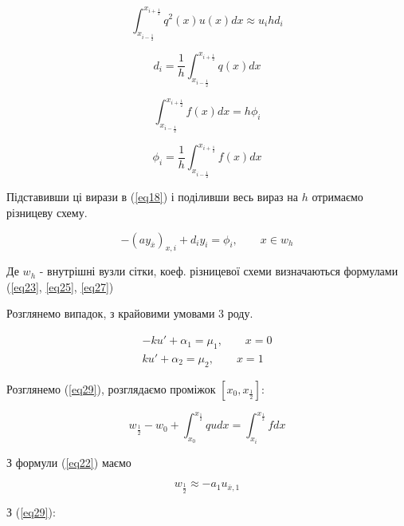 \documentclass[14pt,a4paper]{scrartcl}
\begin{document}
	\begin{equation}\label{eq24}
		\int_{x_{i-\frac{1}{2}}}^{x_{i+\frac{1}{2}}} q^{2}(x)u(x)dx \approx u_{i} h d_{i}
	\end{equation}
	
	
	\begin{equation}\label{eq25}
		d_{i} = \frac{1}{h}\int_{x_{i-\frac{1}{2}}}^{x_{i+\frac{1}{2}}} q(x)dx
	\end{equation}
	
	\begin{equation}\label{eq26}
		\int_{x_{i-\frac{1}{2}}}^{x_{i+\frac{1}{2}}} f(x)dx = h \phi_{i}
	\end{equation}
	
	\begin{equation}\label{eq27}
		\phi_{i} = \frac{1}{h} \int_{x_{i-\frac{1}{2}}}^{x_{i+\frac{1}{2}}} f(x)dx
	\end{equation}	
	
	Підставивши ці вирази в (\ref{eq18}) і поділивши весь вираз на $h$ отримаємо різницеву схему.
	
	
	\begin{equation}\label{eq28}
		-(a y_{\overline{x}})_{x,i} + d_{i}y_{i}  = \phi_{i}, \qquad x \in w_h 
	\end{equation}	
	
	Де $w_h$ - внутрішні вузли сітки, коеф. різницевої схеми визначаються формулами (\ref{eq23}, \ref{eq25}, \ref{eq27})	
	
	Розглянемо випадок, з крайовими умовами 3 роду.
	
	\begin{gather}
	-ku' + \alpha_{1} = \mu_{1}, \qquad x =0 \label{eq29}\\
	ku' + \alpha_{2} = \mu_{2}, \qquad x =1 \label{eq30}
	\end{gather}
	
	Розглянемо (\ref{eq29}), розглядаємо проміжок $[x_{0}, x_{\frac{1}{2}}]$:
		
	\begin{equation}\label{eq31}
		w_{\frac{1}{2}} - w_{0} + \int_{x_{0}}^{x_{\frac{1}{2}}}qudx =  \int_{x_{i}}^{x_{\frac{1}{2}}}fdx
	\end{equation}	
	
	З формули (\ref{eq22}) маємо
	
	\begin{equation}\label{eq32}
		w_{\frac{1}{2}} \approx -a_{1}u_{\overline{x},1}
	\end{equation}
	
	З (\ref{eq29}):
	
\end{document}
